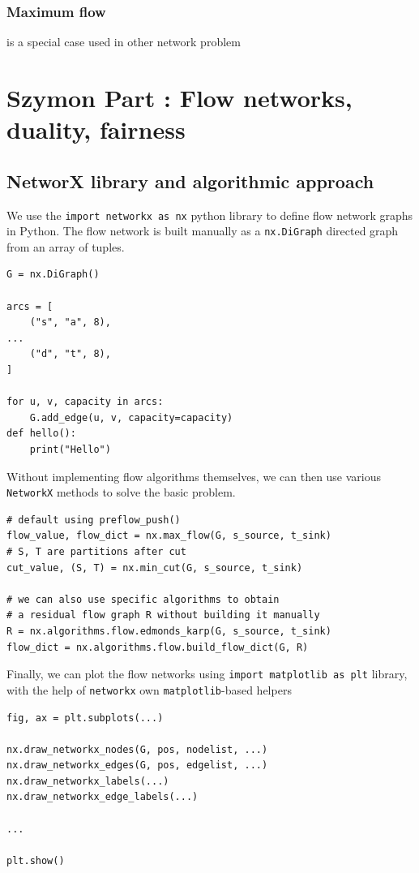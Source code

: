 \documentclass[12pt, openany]{article}
\begin{document}
\subsubsection{Maximum flow} is a special case used in other network problem


\newpage
\section{Szymon Part : Flow networks, duality, fairness}
\subsection{NetworX library and algorithmic approach}

We use the \texttt{import networkx as nx} python library to define flow network graphs in Python. The flow network is built manually as a \texttt{nx.DiGraph} directed graph from an array of tuples.
\begin{verbatim}
G = nx.DiGraph()

arcs = [
    ("s", "a", 8),
...
    ("d", "t", 8),
]

for u, v, capacity in arcs:
    G.add_edge(u, v, capacity=capacity)
def hello():
    print("Hello")
\end{verbatim}

Without implementing flow algorithms themselves, we can then use various \texttt{NetworkX} methods to solve the basic problem.
\begin{verbatim}
# default using preflow_push()
flow_value, flow_dict = nx.max_flow(G, s_source, t_sink)
# S, T are partitions after cut
cut_value, (S, T) = nx.min_cut(G, s_source, t_sink)

# we can also use specific algorithms to obtain
# a residual flow graph R without building it manually
R = nx.algorithms.flow.edmonds_karp(G, s_source, t_sink)
flow_dict = nx.algorithms.flow.build_flow_dict(G, R)
\end{verbatim}

Finally, we can plot the flow networks using \texttt{import matplotlib as plt} library, with the help of \texttt{networkx} own \texttt{matplotlib}-based helpers

\begin{verbatim}
fig, ax = plt.subplots(...)

nx.draw_networkx_nodes(G, pos, nodelist, ...)
nx.draw_networkx_edges(G, pos, edgelist, ...)
nx.draw_networkx_labels(...)
nx.draw_networkx_edge_labels(...)

...

plt.show()
\end{verbatim}
\end{document}
